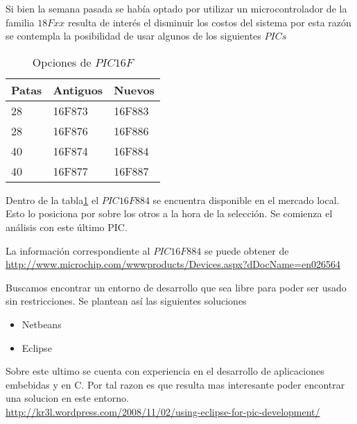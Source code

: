 Si bien la semana pasada se había optado por utilizar un microcontrolador de la familia $18Fxx$ 
resulta de interés el disminuir los costos del sistema por esta razón se contempla la posibilidad
de usar algunos de los siguientes $PICs$

\begin{table}[H]
    \begin{tabular}{l l l}
    \toprule
    \textbf{Patas} & \textbf{Antiguos} & \textbf{Nuevos} \\
    \toprule
    28 & 16F873 & 16F883\\
    28 & 16F876 & 16F886\\
    40 & 16F874 & 16F884\\
    40 & 16F877 & 16F887\\
    \bottomrule
    \end{tabular}
  \caption{Opciones de $PIC 16F$}
  \label{tab:comparacionPIC}
\end{table}

Dentro de la tabla\ref{tab:comparacionPIC} el $PIC16F884$ se encuentra disponible en el mercado local.
Esto lo posiciona por sobre los otros a la hora de la selección. Se comienza el análisis con este 
último PIC.

La información correspondiente al $PIC16F884$ se puede obtener de\\
\url{http://www.microchip.com/wwwproducts/Devices.aspx?dDocName=en026564}

Buscamos encontrar un entorno de desarrollo que sea libre para poder ser usado sin restricciones.
Se plantean así las siguientes soluciones
\begin{itemize}
 \item Netbeans
 \item Eclipse
\end{itemize}
Sobre este ultimo se cuenta con experiencia en el desarrollo de aplicaciones embebidas y en C. Por tal
razon es que resulta mas interesante poder encontrar una solucion en este entorno.\\
\url{http://kr3l.wordpress.com/2008/11/02/using-eclipse-for-pic-development/}